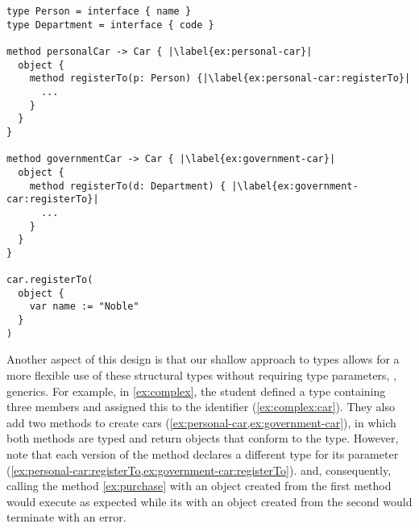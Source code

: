 \begin{lstlisting}[caption={A globally inconsistent program that has a well-typed execution.},escapechar=|,label={ex:complex},float,floatplacement=htb]
type Person = interface { name }
type Department = interface { code }

method personalCar -> Car { |\label{ex:personal-car}|
  object {
    method registerTo(p: Person) {|\label{ex:personal-car:registerTo}|
      ...
    } 
  }
}

method governmentCar -> Car { |\label{ex:government-car}|
  object {
    method registerTo(d: Department) { |\label{ex:government-car:registerTo}|
      ...
    }
  }
}

car.registerTo(
  object {
    var name := "Noble"
  }
)
\end{lstlisting}

Another aspect of this design is
that our shallow approach to types
allows for a more flexible use of these structural types
without requiring type parameters, \ie, generics.
For example, in \cref{ex:complex}, the student defined a type containing
three members and assigned this to the identifier  (\cref{ex:complex:car}).
They also add two methods to create cars 
(\cref{ex:personal-car,ex:government-car}),
in which both methods are typed and return objects that conform to
the  type.
However, note that each version of the  method
declares a different type for its parameter
(\cref{ex:personal-car:registerTo,ex:government-car:registerTo}).
and, consequently, calling the 
 method \cref{ex:purchase} with
an object created from the first method would execute as expected
while its with an object created from the second would terminate with
an error. 




